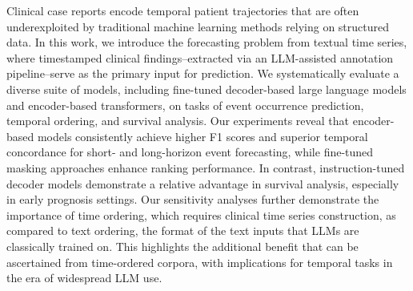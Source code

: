 \vspace{-.5em}
Clinical case reports encode temporal patient trajectories that are often underexploited by traditional machine learning methods relying on structured data. 
In this work, we introduce the forecasting problem from textual time series, where timestamped clinical findings--extracted via an LLM-assisted annotation pipeline--serve as the primary input for prediction. 
We systematically evaluate a diverse suite of models, including fine-tuned decoder-based large language models and encoder-based transformers, on tasks of event occurrence prediction, temporal ordering, and survival analysis. 
Our experiments reveal that encoder-based models consistently achieve higher F1 scores and superior temporal concordance for short- and long-horizon event forecasting, while fine-tuned masking approaches enhance ranking performance. 
In contrast, instruction-tuned decoder models demonstrate a relative advantage in survival analysis, especially in early prognosis settings. 
Our sensitivity analyses further demonstrate the importance of time ordering, which requires clinical time series construction, as compared to text ordering, the format of the text inputs that LLMs are classically trained on. 
This highlights the additional benefit that can be ascertained from time-ordered corpora, with implications for temporal tasks in the era of widespread LLM use.